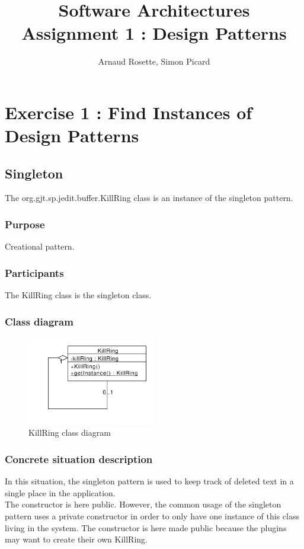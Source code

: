 \documentclass[a4paper,10pt]{article}
\title{Software Architectures\\ Assignment 1 : Design Patterns}
\author{Arnaud Rosette, Simon Picard}
\begin{document}
\maketitle
\section{Exercise 1 : Find Instances of Design Patterns}
\subsection{Singleton}%
The org.gjt.sp.jedit.buffer.KillRing class is an instance of the singleton pattern.

\subsubsection{Purpose}
Creational pattern.
\subsubsection{Participants}
The KillRing class is the singleton class.
\subsubsection{Class diagram}
\begin{center}
\begin{figure}[h]
  \centerline{\includegraphics[width=0.5\textwidth]{singleton-killring-class-diagram.pdf}}
  \caption{KillRing class diagram}
\end{figure}
\end{center}
\subsubsection{Concrete situation description}
In this situation, the singleton pattern is used to keep track of deleted text in a single place in the application.\\
The constructor is here public. However, the common usage of the singleton pattern uses a private constructor in order to only have one instance of this class living in the system. The constructor is here made public because the plugins may want to create their own KillRing. 
\end{document}
